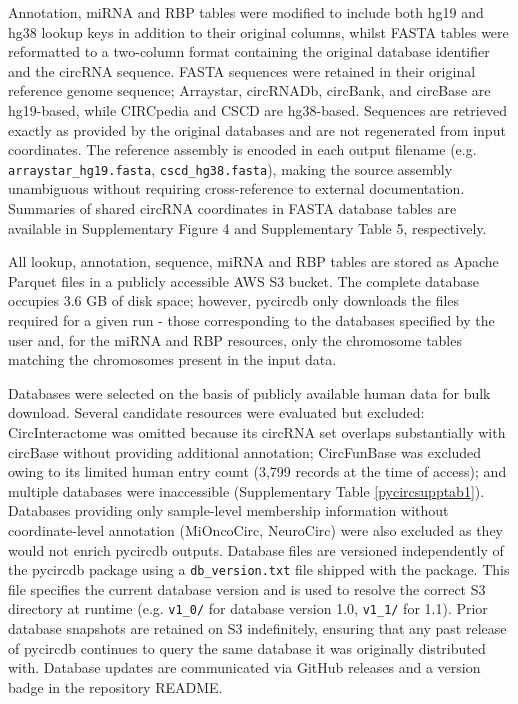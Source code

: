 Annotation, miRNA and RBP tables were modified to include both hg19 and hg38 lookup keys in addition to their original columns, whilst FASTA tables were reformatted to a two-column format containing the original database identifier and the circRNA sequence. FASTA sequences were retained in their original reference genome sequence; Arraystar, circRNADb, circBank, and circBase are hg19-based, while CIRCpedia and CSCD are hg38-based. Sequences are retrieved exactly as provided by the original databases and are not regenerated from input coordinates. The reference assembly is encoded in each output filename (e.g. \texttt{arraystar\_hg19.fasta}, \texttt{cscd\_hg38.fasta}), making the source assembly unambiguous without requiring cross-reference to external documentation. Summaries of shared circRNA coordinates in FASTA database tables are available in Supplementary Figure 4 and Supplementary Table 5, respectively.


All lookup, annotation, sequence, miRNA and RBP tables are stored as Apache Parquet files in a publicly accessible AWS S3 bucket. The complete database occupies 3.6 GB of disk space; however, pycircdb only downloads the files required for a given run - those corresponding to the databases specified by the user and, for the miRNA and RBP resources, only the chromosome tables matching the chromosomes present in the input data.

Databases were selected on the basis of publicly available human data for bulk download. Several candidate resources were evaluated but excluded: CircInteractome was omitted because its circRNA set overlaps substantially with circBase without providing additional annotation; CircFunBase was excluded owing to its limited human entry count (3,799 records at the time of access); and multiple databases were inaccessible (Supplementary Table \ref{pycircsupptab1}). Databases providing only sample-level membership information without coordinate-level annotation (MiOncoCirc, NeuroCirc) were also excluded as they would not enrich pycircdb outputs. Database files are versioned independently of the pycircdb package using a \texttt{db\_version.txt} file shipped with the package. This file specifies the current database version and is used to resolve the correct S3 directory at runtime (e.g. \texttt{v1\_0/} for database version 1.0, \texttt{v1\_1/} for 1.1). Prior database snapshots are retained on S3 indefinitely, ensuring that any past release of pycircdb continues to query the same database it was originally distributed with. Database updates are communicated via GitHub releases and a version badge in the repository README.

